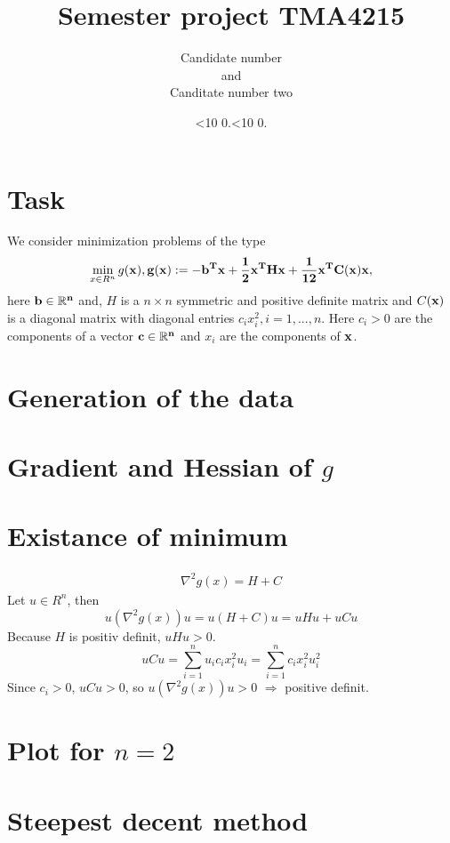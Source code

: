 \documentclass[a4paper,12pt]{article}
\newcommand{\leadingzero}[1]{\ifnum #1<10 0\the#1\else\the#1\fi}
\newcommand{\mytoday}{\leadingzero{\day}.\leadingzero{\month}.\the\year}
\begin{document}
\title{Semester project TMA4215}
\author{Candidate number\\ and\\ Canditate number two}
\date{\mytoday}
\maketitle
\newpage


\section{Task}
We consider minimization problems of the type
\begin{align*}
\min_{x \in R^n} g(\bf{x}), g(\bf{x}):=-\bf{b}^T\bf{x} + \frac12\bf{x}^TH\bf{x}+\frac1{12}\bf{x}^TC(\bf{x})\bf{x},
\end{align*}
here $\bf{b} \in \mathbb{R}^n$ and, $H$ is a $n \times n$ symmetric and positive definite matrix and $C(\bf{x})$ is a diagonal
matrix with diagonal entries $c_i x^2_i, i = 1, . . . , n$. 
Here $c_i > 0$ are the components of a vector $\bf{c} \in \mathbb{R}^n$ 
and $x_i$ are the components of $\bf{x}$. 
\section{Generation of the data}



\section{Gradient and Hessian of $g$}




\section{Existance of minimum}
\begin{align*}
\nabla^2g(x)=H+C
\end{align*}
Let $u\in R^n$, then
$$u(\nabla^2g(x))u = u (H+C) u = u H u + uCu$$
Because $H$ is positiv definit, $uHu>0$. 
$$uCu = \sum_{i=1}^n u_i c_i x_i^2 u_i = \sum_{i=1}^n c_ix_i^2u_i^2$$
Since $c_i>0$, $uCu>0$, so $u(\nabla^2g(x))u>0$ $\Rightarrow$ positive definit.
\section{Plot for $n=2$}

\section{Steepest decent method}
\end{document}

